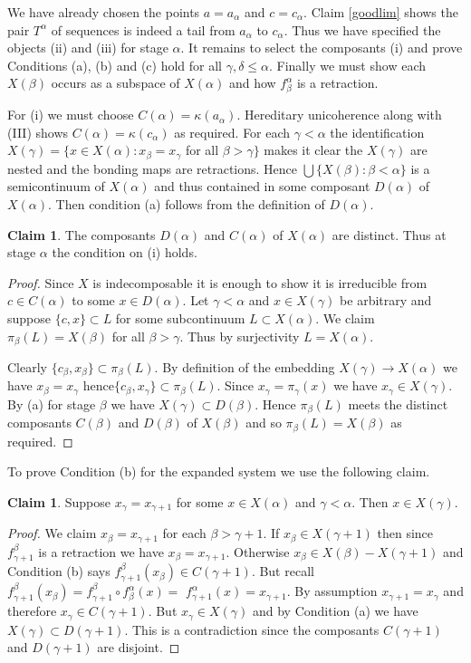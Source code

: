 \documentclass[12pt]{article}
\theoremstyle{plain}
\theoremstyle{definition}
\newcounter{ClaimCounter}
\newtheorem{claim}[ClaimCounter]{Claim}
\newcounter{claim5counter}
\newcommand{\A}{\ensuremath{\alpha}}
\newcommand{\K}{\ensuremath{\kappa}}
\newcommand{\B}{\ensuremath{\beta}}
\newcommand{\G}{\ensuremath{\gamma}}
\newcommand{\D}{\ensuremath{\delta}}
\newcommand{\0}{\ensuremath{\varnothing}}
\begin{document}
	
	We have already chosen the points $a = a_\A$ and $c = c_\A$. Claim \ref{goodlim} shows the pair $T^\A$ of sequences is indeed a tail from $a_\A$ to $c_\A$. Thus we have specified the objects (ii) and (iii) for stage $\A$. It remains to select the composants (i) and prove Conditions (a), (b) and (c) hold for all $\G,\D \le \A$. Finally we must show each $X(\B)$ occurs as a subspace of $X(\A)$ and how $f^\A_\B$ is a retraction.
	
	For (i) we must choose $C(\A) = \K(a_\A)$. Hereditary unicoherence along with (III) shows $C(\A) = \K(c_\A)$ as required.
	For each $\G<\A$ the identification $X(\G)=\big \{x\in X(\A): x_\B = x_\G$ for all $\B > \G \big \}$ makes it clear the $X(\G)$ are nested and the bonding maps are retractions. Hence $\bigcup\{ X(\B): \B < \A\}$ is a semicontinuum of $X(\A)$ and thus contained in some composant $D(\A)$ of $X(\A)$. Then condition (a) follows from the definition of $D(\A)$.
	
	\begin{claim}\label{data(i)}
		The composants $D(\A)$ and $C(\A)$ of $X(\A)$ are distinct. Thus at stage $\A$ the condition on (i) holds.
	\end{claim}
	
	\begin{proof}
		Since $X$ is indecomposable it is enough to show it is irreducible from $c \in C(\A)$ to some $x \in D(\A)$.
		Let $\G < \A$ and $x \in X(\G)$ be arbitrary and suppose $\{c,x\} \subset L$ for some subcontinuum  $L \subset X(\A)$.
		We claim $\pi_\B(L)=X(\B)$ for all $\B>\G$. Thus by surjectivity $L=X(\A)$.
		
		Clearly $\{c_{\B},x_{\B}\} \subset \pi_\B(L)$. By definition of the embedding $X(\G) \to X(\A)$ we have $x_{\B} = x_\G$ hence$\{c_{\B},x_{\G}\} \subset \pi_\B(L)$.
		Since $x_\G = \pi_\G(x)$ we have $x_\G \in X(\G)$. 
		By (a) for stage $\B$ we have $X(\G) \subset D(\B)$. Hence $\pi_\B(L)$ meets the distinct composants $C(\B)$ and $D(\B)$ of $X(\B)$ and so $\pi_\B(L) = X(\B)$ as required.
	\end{proof}
	
	To prove Condition (b) for the expanded system we use the following claim.
	
	\begin{claim}\label{string}
		Suppose $x_\G = x_{\G+1}$ for some $x \in X(\A)$ and $\G<\A$. Then $x \in X(\G)$.
	\end{claim}
	
	\begin{proof}	
		We claim $x_{\B}=x_{\G+1}$ for each $\B > \G+1$.  If $x_\B \in X(\G+1)$ then since $f^\B_{\G+1}$ is a retraction we have $x_\B = x_{\G+1}$. Otherwise $x_\B \in X(\B) - X(\G+1)$ and Condition (b) says $f^\B_{\G+1} (x_\B) \in C(\G+1)$. But recall \mbox{$f^\B_{\G+1} (x_\B) =  f^\B_{\G+1} \circ f^\A_\B (x) = $} $f^\A_{\G+1}(x) = x_{\G+1}$. By assumption $x_{\G+1} = x_\G$ and therefore $x_\G \in C(\G+1)$. But $x_\G \in X(\G)$ and by Condition (a) we have $X(\G) \subset D(\G+1)$.
		This is a contradiction since the composants $C(\G+1)$ and $D(\G+1)$ are disjoint.
	\end{proof}
	
\end{document}
